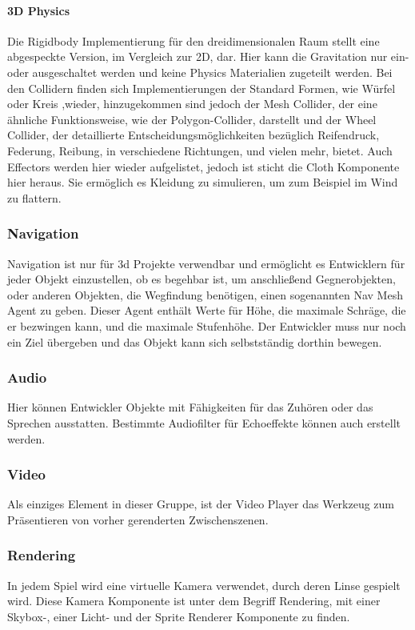 \paragraph{3D Physics}
Die Rigidbody Implementierung für den dreidimensionalen Raum stellt eine abgespeckte Version, im Vergleich zur 2D, dar. Hier kann die Gravitation nur ein- oder ausgeschaltet werden und keine Physics Materialien zugeteilt werden.
Bei den Collidern finden sich Implementierungen der Standard Formen, wie Würfel oder Kreis ,wieder, hinzugekommen sind jedoch der Mesh Collider, der eine ähnliche Funktionsweise, wie der Polygon-Collider, darstellt und der Wheel Collider, der detaillierte Entscheidungsmöglichkeiten bezüglich Reifendruck, Federung, Reibung, in verschiedene Richtungen, und vielen mehr, bietet. 
Auch Effectors werden hier wieder aufgelistet, jedoch ist sticht die Cloth Komponente hier heraus. Sie ermöglich es Kleidung zu simulieren, um zum Beispiel im Wind zu flattern.
\subsubsection{Navigation}
Navigation ist nur für 3d Projekte verwendbar und ermöglicht es Entwicklern für jeder Objekt einzustellen, ob es begehbar ist, um anschließend Gegnerobjekten, oder anderen Objekten, die Wegfindung benötigen, einen sogenannten Nav Mesh Agent zu geben. Dieser Agent enthält Werte für Höhe, die maximale Schräge, die er bezwingen kann, und die maximale Stufenhöhe. Der Entwickler muss nur noch ein Ziel übergeben und das Objekt kann sich selbstständig dorthin bewegen.
\subsubsection{Audio}
Hier können Entwickler Objekte mit Fähigkeiten für das Zuhören oder das Sprechen ausstatten. Bestimmte Audiofilter für Echoeffekte können auch erstellt werden.
\subsubsection{Video}
Als einziges Element in dieser Gruppe, ist der Video Player das Werkzeug zum Präsentieren von vorher gerenderten Zwischenszenen.
\subsubsection{Rendering}
In jedem Spiel wird eine virtuelle Kamera verwendet, durch deren Linse gespielt wird. Diese Kamera Komponente ist unter dem Begriff Rendering, mit einer Skybox-, einer Licht- und der Sprite Renderer Komponente zu finden.
